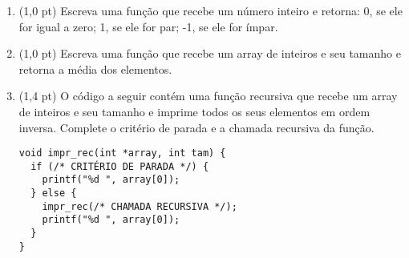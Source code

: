 \documentclass[a4paper,10pt]{article}
\begin{document}
\begin{multicols*}{2}
\begin{enumerate}
\begin{verbatim}
int main() {
  int linha = 6;
  int coluna;
  char simbolo;

  while (linha >= 1) {
    coluna = 1;
    while (coluna <= 6) {
      if (linha % 2 == 1) {
        simbolo = '<';
      } else {
        simbolo = '>';
      }
      printf("%d", simbolo);
      coluna++;
    }
    linha--;
    printf("\n");
  }

  return 0;
}
  \end{verbatim}

  \vfill\null
  \columnbreak

  \item (1,0 pt) Escreva uma função que recebe um número inteiro e retorna: 0, se ele for igual a zero; 1, se ele for par; -1, se ele for ímpar.

  \item (1,0 pt) Escreva uma função que recebe um array de inteiros e seu tamanho e retorna a média dos elementos.

  \item (1,4 pt) O código a seguir contém uma função recursiva que recebe um array de inteiros e seu tamanho e imprime todos os seus elementos em ordem inversa. Complete o critério de parada e a chamada recursiva da função.

  \begin{verbatim}
void impr_rec(int *array, int tam) {
  if (/* CRITÉRIO DE PARADA */) {
    printf("%d ", array[0]);
  } else {
    impr_rec(/* CHAMADA RECURSIVA */);
    printf("%d ", array[0]);
  }
}
  \end{verbatim}
\end{enumerate}
\end{multicols*}
\end{document}

